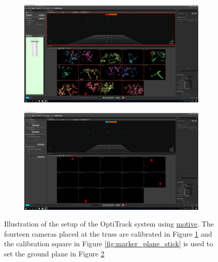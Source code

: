 \documentclass[../Head/report.tex]{subfiles}
\begin{document}
\begin{figure}[H]
    \centering
    \begin{subfigure}[t]{.45\textwidth}
        \centering
        \includegraphics[width=\textwidth]{../Figures/optitrack/optitrac_software_one.PNG}
        \caption{}
        \label{fig:optitrack_software_one}
    \end{subfigure}
    \begin{subfigure}[t]{.45\textwidth}
        \centering
        \includegraphics[width=\textwidth]{../Figures/optitrack/optitrac_software_three.PNG}
        \caption{}
        \label{fig:optitrack_software_two}
    \end{subfigure}
    \caption{Illustration of the setup of the OptiTrack system using \href{https://optitrack.com/software/motive/}{motive}. The fourteen cameras placed at the truss are calibrated in Figure \ref{fig:optitrack_software_one} and the calibration square in Figure \ref{fig:marker_plane_stick} is used to set the ground plane in Figure \ref{fig:optitrack_software_two}}  
    \label{fig:optitrack_setup_drone}
\end{figure}    
\end{document}
